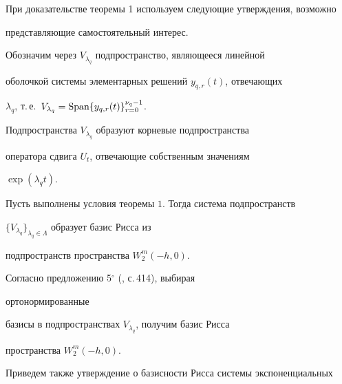  


При доказательстве теоремы 1 используем следующие утверждения, возможно 


представляющие самостоятельный интерес. 


 


Обозначим через $V_{\lambda_q}$ подпространство, являющееся линейной 


оболочкой системы элементарных решений $y_{q,r}(t)$, отвечающих 


$\lambda_q$, т.\,е.~$V_{\lambda_q}= 


\Span\{y_{q,r}(t)\}^{\nu_q-1}_{r=0}$. 


 


\begin{note} 


Подпространства $V_{\lambda_q}$ образуют корневые подпространства 


оператора сдвига $U_t$, отвечающие собственным значениям 


$\exp(\lambda_q t)$. 


\end{note} 


 


\begin{thm} 


Пусть выполнены условия теоремы $1$. Тогда система подпространств 


$\{V_{\lambda_q}\}_{\lambda_q\in\Lambda}$ образует базис Рисса из 


подпространств пространства $W^m_2(-h,0)$. 


\end{thm} 


 


\begin{note} 


Согласно предложению 5$^\circ$ (\cite{3}, с.\,414), выбирая 


ортонормированные 


базисы в подпространствах $V_{\lambda_q}$, получим базис Рисса 


пространства $W^m_2(-h,0)$. 


\end{note} 


 


Приведем также утверждение о базисности Рисса системы экспоненциальных 


